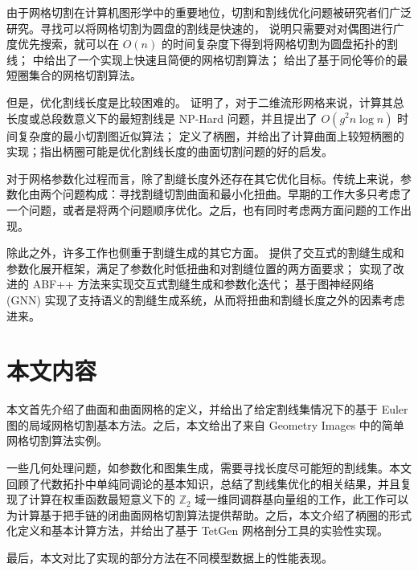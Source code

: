 由于网格切割在计算机图形学中的重要地位，切割和割线优化问题被研究者们广泛研究。寻找可以将网格切割为圆盘的割线是快速的，\citet{Dey1995} 说明只需要对对偶图进行广度优先搜索，就可以在 $ O(n) $ 的时间复杂度下得到将网格切割为圆盘拓扑的割线；\citet{Gu2002} 中给出了一个实现上快速且简便的网格切割算法；\citet{DeVerdiere2005} 给出了基于同伦等价的最短圈集合的网格切割算法。

但是，优化割线长度是比较困难的。\citet{Erickson2002} 证明了，对于二维流形网格来说，计算其总长度或总段数意义下的最短割线是 NP-Hard 问题，并且提出了 $ O(g^2 n \log n) $ 时间复杂度的最小切割图近似算法；\citet{oncomputinghantun} 定义了柄圈，并给出了计算曲面上较短柄圈的实现\cite{Dey2013}\cite{Dey2008}；\citet{Chai2018}指出柄圈可能是优化割线长度的曲面切割问题的好的启发。

对于网格参数化过程而言，除了割缝长度外还存在其它优化目标。传统上来说，参数化由两个问题构成：寻找割缝切割曲面\cite{qdmeshseg}\cite{KhodakovskyLS03}和最小化扭曲\cite{Desbrun2002}\cite{KhodakovskyLS03}。早期的工作大多只考虑了一个问题，或者是将两个问题顺序优化。之后，也有同时考虑两方面问题的工作出现\cite{Li2018}。

除此之外，许多工作也侧重于割缝生成的其它方面。\citet{Poranne2017} 提供了交互式的割缝生成和参数化展开框架，满足了参数化时低扭曲和对割缝位置的两方面要求；\citet{wysiwyg} 实现了改进的 ABF++ 方法来实现交互式割缝生成和参数化迭代；\citet{teimury2020graphseam} 基于图神经网络 (GNN) 实现了支持语义的割缝生成系统，从而将扭曲和割缝长度之外的因素考虑进来。

\section{本文内容}

本文首先介绍了曲面和曲面网格的定义，并给出了给定割线集情况下的基于 Euler 图的局域网格切割基本方法。之后，本文给出了来自 Geometry Images 中的简单网格切割算法实例。
  
一些几何处理问题，如参数化和图集生成，需要寻找长度尽可能短的割线集。本文回顾了代数拓扑中单纯同调论的基本知识，总结了割线集优化的相关结果，并且复现了计算在权重函数最短意义下的 $ \mathbb{Z}_2 $ 域一维同调群基向量组的工作，此工作可以为计算基于把手链的闭曲面网格切割算法提供帮助。之后，本文介绍了柄圈的形式化定义和基本计算方法，并给出了基于 TetGen 网格剖分工具的实验性实现。

最后，本文对比了实现的部分方法在不同模型数据上的性能表现。


